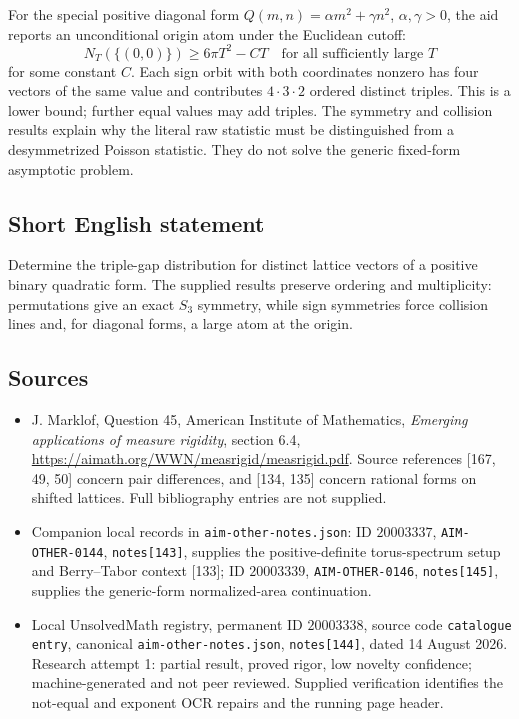 \documentclass[11pt]{article}
\begin{document}
For the special positive diagonal form $Q(m,n)=\alpha m^2+\gamma n^2$, $\alpha,\gamma>0$, the aid reports an unconditional origin atom under the Euclidean cutoff:
\[
 N_T(\{(0,0)\})\ge6\pi T^2-CT
 \quad\text{for all sufficiently large }T
\]
for some constant $C$. Each sign orbit with both coordinates nonzero has four vectors of the same value and contributes $4\cdot3\cdot2$ ordered distinct triples. This is a lower bound; further equal values may add triples. The symmetry and collision results explain why the literal raw statistic must be distinguished from a desymmetrized Poisson statistic. They do not solve the generic fixed-form asymptotic problem.
\subsection{Short English statement}
Determine the triple-gap distribution for distinct lattice vectors of a positive binary quadratic form. The supplied results preserve ordering and multiplicity: permutations give an exact $S_3$ symmetry, while sign symmetries force collision lines and, for diagonal forms, a large atom at the origin.
\subsection{Sources}
\begin{itemize}
\item J. Marklof, Question 45, American Institute of Mathematics, \emph{Emerging applications of measure rigidity}, section 6.4, \url{https://aimath.org/WWN/measrigid/measrigid.pdf}. Source references [167, 49, 50] concern pair differences, and [134, 135] concern rational forms on shifted lattices. Full bibliography entries are not supplied.
\item Companion local records in \texttt{aim-other-notes.json}: ID $20003337$, \texttt{AIM-OTHER-0144}, \texttt{notes[143]}, supplies the positive-definite torus-spectrum setup and Berry--Tabor context [133]; ID $20003339$, \texttt{AIM-OTHER-0146}, \texttt{notes[145]}, supplies the generic-form normalized-area continuation.
\item Local UnsolvedMath registry, permanent ID $20003338$, source code \texttt{catalogue entry}, canonical \texttt{aim-other-notes.json}, \texttt{notes[144]}, dated 14 August 2026. Research attempt 1: partial result, proved rigor, low novelty confidence; machine-generated and not peer reviewed. Supplied verification identifies the not-equal and exponent OCR repairs and the running page header.
\end{itemize}
\end{document}
